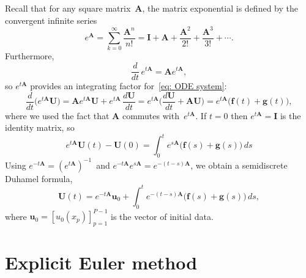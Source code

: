 Recall that for any square matrix~$\boldsymbol{A}$, the matrix exponential
is defined by the convergent infinite series
\[
e^{\boldsymbol{A}}=\sum_{k=0}^\infty\frac{\boldsymbol{A}^n}{n!}
	=\boldsymbol{I}+\boldsymbol{A}+\frac{\boldsymbol{A}^2}{2!}
	+\frac{\boldsymbol{A}^3}{3!}+\cdots.
\]
Furthermore,
\[
\frac{d}{dt}\,e^{t\boldsymbol{A}}=\boldsymbol{A}e^{t\boldsymbol{A}},
\]
so $e^{t\boldsymbol{A}}$ provides an integrating factor 
for~\eqref{eq: ODE system}:
\[
\frac{d}{dt}\bigl(e^{t\boldsymbol{A}}\boldsymbol{U}\bigr)
	=\boldsymbol{A}e^{t\boldsymbol{A}}\boldsymbol{U}
	+e^{t\boldsymbol{A}}\,\frac{d\boldsymbol{U}}{dt}
	=e^{t\boldsymbol{A}}\biggl(\frac{d\boldsymbol{U}}{dt}
	+\boldsymbol{A}\boldsymbol{U}\biggr)
	=e^{t\boldsymbol{A}}\bigl(\boldsymbol{f}(t)+\boldsymbol{g}(t)\bigr),
\]
where we used the fact that $\boldsymbol{A}$ commutes 
with~$e^{t\boldsymbol{A}}$.  If $t=0$ then $e^{t\boldsymbol{A}}=\boldsymbol{I}$
is the identity matrix, so
\[
e^{t\boldsymbol{A}}\boldsymbol{U}(t)-\boldsymbol{U}(0)
	=\int_0^te^{s\boldsymbol{A}}\bigl(
		\boldsymbol{f}(s)+\boldsymbol{g}(s)\bigr)\,ds
\]
Using $e^{-t\boldsymbol{A}}=(e^{t\boldsymbol{A}})^{-1}$~and 
$e^{-t\boldsymbol{A}}e^{s\boldsymbol{A}}=e^{-(t-s)\boldsymbol{A}}$, we obtain
a semidiscrete Duhamel formula,
\[
\boldsymbol{U}(t)=e^{-t\boldsymbol{A}}\boldsymbol{u}_0
	+\int_0^te^{-(t-s)\boldsymbol{A}}\bigl(
		\boldsymbol{f}(s)+\boldsymbol{g}(s)\bigr)\,ds,
\]
where $\boldsymbol{u}_0=[u_0(x_p)]_{p=1}^{P-1}$ is the vector of initial data.

\section{Explicit Euler method}

